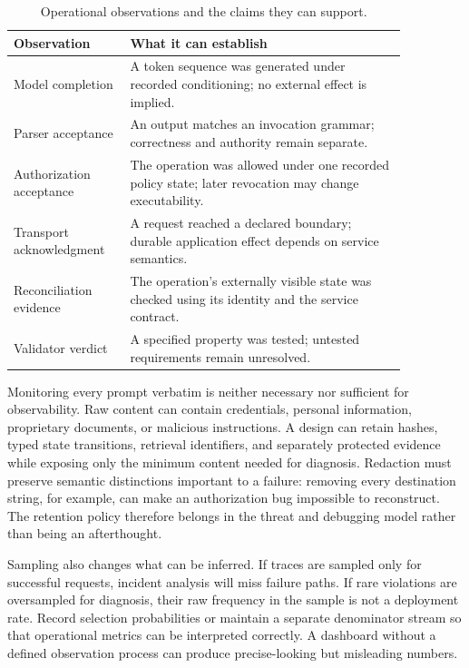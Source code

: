 \begin{table}[!htbp]
\centering
\caption{Operational observations and the claims they can support.}\label{tab:C32:observations}
\begin{tabular}{L{0.24\linewidth}L{0.62\linewidth}}

\toprule Observation & What it can establish\\\midrule
Model completion & A token sequence was generated under recorded conditioning; no external effect is implied.\\
Parser acceptance & An output matches an invocation grammar; correctness and authority remain separate.\\
Authorization acceptance & The operation was allowed under one recorded policy state; later revocation may change executability.\\
Transport acknowledgment & A request reached a declared boundary; durable application effect depends on service semantics.\\
Reconciliation evidence & The operation's externally visible state was checked using its identity and the service contract.\\
Validator verdict & A specified property was tested; untested requirements remain unresolved.\\
\bottomrule
\end{tabular}
\end{table}

Monitoring every prompt verbatim is neither necessary nor sufficient for observability. Raw content can contain credentials, personal information, proprietary documents, or malicious instructions. A design can retain hashes, typed state transitions, retrieval identifiers, and separately protected evidence while exposing only the minimum content needed for diagnosis. Redaction must preserve semantic distinctions important to a failure: removing every destination string, for example, can make an authorization bug impossible to reconstruct. The retention policy therefore belongs in the threat and debugging model rather than being an afterthought.

Sampling also changes what can be inferred. If traces are sampled only for successful requests, incident analysis will miss failure paths. If rare violations are oversampled for diagnosis, their raw frequency in the sample is not a deployment rate. Record selection probabilities or maintain a separate denominator stream so that operational metrics can be interpreted correctly. A dashboard without a defined observation process can produce precise-looking but misleading numbers.

